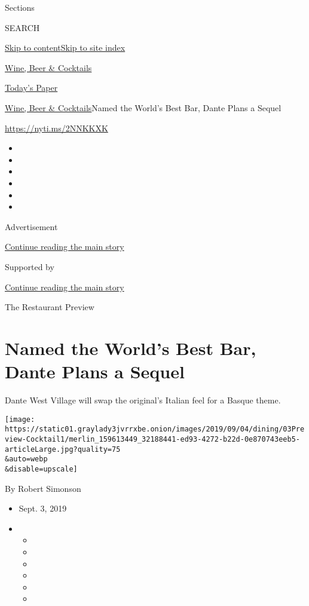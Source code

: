 Sections

SEARCH

\protect\hyperlink{site-content}{Skip to
content}\protect\hyperlink{site-index}{Skip to site index}

\href{https://www.nytimes3xbfgragh.onion/section/food/drinks}{Wine, Beer
\& Cocktails}

\href{https://myaccount.nytimes3xbfgragh.onion/auth/login?response_type=cookie\&client_id=vi}{}

\href{https://www.nytimes3xbfgragh.onion/section/todayspaper}{Today's
Paper}

\href{/section/food/drinks}{Wine, Beer \& Cocktails}\textbar{}Named the
World's Best Bar, Dante Plans a Sequel

\url{https://nyti.ms/2NNKKXK}

\begin{itemize}
\item
\item
\item
\item
\item
\item
\end{itemize}

Advertisement

\protect\hyperlink{after-top}{Continue reading the main story}

Supported by

\protect\hyperlink{after-sponsor}{Continue reading the main story}

The Restaurant Preview

\hypertarget{named-the-worlds-best-bar-dante-plans-a-sequel}{%
\section{Named the World's Best Bar, Dante Plans a
Sequel}\label{named-the-worlds-best-bar-dante-plans-a-sequel}}

Dante West Village will swap the original's Italian feel for a Basque
theme.

\texttt{[image: https://static01.graylady3jvrrxbe.onion/images/2019/09/04/dining/03Preview-Cocktail1/merlin\_159613449\_32188441-ed93-4272-b22d-0e870743eeb5-articleLarge.jpg?quality=75\\\&auto=webp\\\&disable=upscale]}

By Robert Simonson

\begin{itemize}
\item
  Sept. 3, 2019
\item
  \begin{itemize}
  \item
  \item
  \item
  \item
  \item
  \item
  \end{itemize}
\end{itemize}

